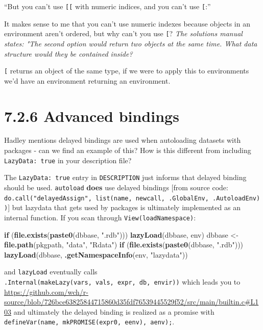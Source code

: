 \documentclass[]{book}
\newenvironment{Shaded}{\begin{snugshade}}{\end{snugshade}}
\newcommand{\ControlFlowTok}[1]{\textcolor[rgb]{0.13,0.29,0.53}{\textbf{#1}}}
\newcommand{\KeywordTok}[1]{\textcolor[rgb]{0.13,0.29,0.53}{\textbf{#1}}}
\newcommand{\NormalTok}[1]{#1}
\newcommand{\StringTok}[1]{\textcolor[rgb]{0.31,0.60,0.02}{#1}}
\begin{document}
``But you can't use \texttt{{[}{[}} with numeric indices, and you can't use \texttt{{[}}:''

It makes sense to me that you can't use numeric indexes because objects in an environment aren't ordered, but why can't you use \texttt{{[}}? \emph{The solutions manual states: "The second option would return two objects at the same time. What data structure would they be contained inside?}

\texttt{{[}} returns an object of the same type, if we were to apply this to environments we'd have an environment returning an environment.

\hypertarget{advanced-bindings}{%
\section*{7.2.6 Advanced bindings}\label{advanced-bindings}}

Hadley mentions delayed bindings are used when autoloading datasets with packages - can we find an example of this? How is this different from including \texttt{LazyData:\ true} in your description file?

The \texttt{LazyData:\ true} entry in \texttt{DESCRIPTION} just informs that delayed binding should be used. \texttt{autoload} \textbf{does} use delayed bindings {[}from source code: \texttt{do.call("delayedAssign",\ list(name,\ newcall,\ .GlobalEnv,\ .AutoloadEnv))}{]} but lazydata that gets used by packages is ultimately implemented as an internal function. If you scan through \texttt{View(loadNamespace)}:

\begin{Shaded}
\begin{Highlighting}[]
\ControlFlowTok{if}\NormalTok{ (}\KeywordTok{file.exists}\NormalTok{(}\KeywordTok{paste0}\NormalTok{(dbbase, }\StringTok{".rdb"}\NormalTok{))) }
      \KeywordTok{lazyLoad}\NormalTok{(dbbase, env)}
\NormalTok{    dbbase <-}\StringTok{ }\KeywordTok{file.path}\NormalTok{(pkgpath, }\StringTok{"data"}\NormalTok{, }\StringTok{"Rdata"}\NormalTok{)}
    \ControlFlowTok{if}\NormalTok{ (}\KeywordTok{file.exists}\NormalTok{(}\KeywordTok{paste0}\NormalTok{(dbbase, }\StringTok{".rdb"}\NormalTok{))) }
      \KeywordTok{lazyLoad}\NormalTok{(dbbase, }\KeywordTok{.getNamespaceInfo}\NormalTok{(env, }\StringTok{"lazydata"}\NormalTok{))}
\end{Highlighting}
\end{Shaded}

and \texttt{lazyLoad} eventually calls \texttt{.Internal(makeLazy(vars,\ vals,\ expr,\ db,\ envir))} which leads you to \url{https://github.com/wch/r-source/blob/726bce63825844715860d35fdf76539445529f52/src/main/builtin.c\#L103}
and ultimately the delayed binding is realized as a promise with \texttt{defineVar(name,\ mkPROMISE(expr0,\ eenv),\ aenv);}.
\end{document}
